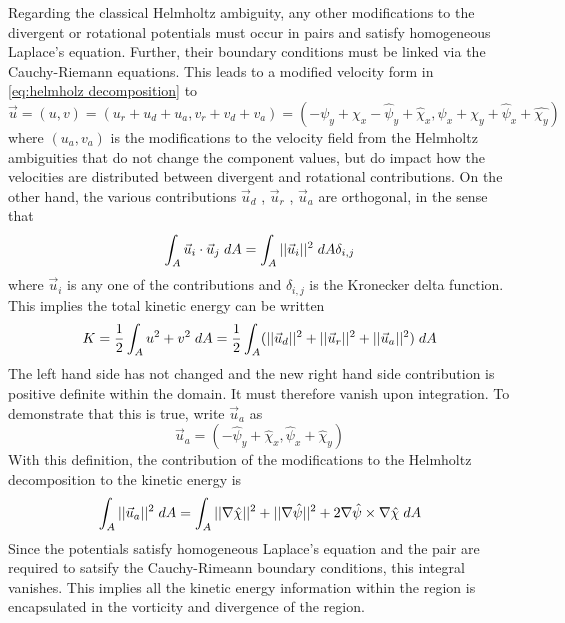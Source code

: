 \documentclass[draft]{agujournal2019}
\begin{document}
Regarding the classical Helmholtz ambiguity, any other modifications to the divergent or rotational potentials must occur in pairs and satisfy homogeneous Laplace’s equation. Further, their boundary conditions must be linked via the Cauchy-Riemann equations. This leads to a modified velocity form in \eqref{eq:helmholz decomposition} to
\begin{equation}
    \vec{u} = (u,v) = (u_r + u_d + u_a, v_r + v_d + v_a) = (-\psi_y + \chi_x - \hat{\psi}_y + \hat{\chi}_x, \psi_x + \chi_y + \hat{\psi}_x + \hat{\chi_y}) \label{eq:helmholz decomposition hatted}
\end{equation}
where $(u_a,v_a)$ is the modifications to the velocity field from the Helmholtz ambiguities that do not change the component values, but do impact how the velocities are distributed between divergent and rotational contributions. On the other hand, the various contributions $\vec{u}_d$ , $\vec{u}_r$ , $\vec{u}_a$ are orthogonal, in the sense that
\begin{equation}
    \int_A \vec{u}_i \cdot \vec{u}_j \hspace{1mm} dA = \int_A ||\vec{u}_i||^2 \hspace{1mm} dA \delta_{i,j}
\end{equation}
where $\vec{u}_i$ is any one of the contributions and $\delta_{i,j}$ is the Kronecker delta function. This implies the total kinetic energy can be written
\begin{equation}
    K = \frac{1}{2}\int_A u^2 + v^2 \hspace{1mm}dA = \frac{1}{2}\int_A (||\vec{u}_d||^2 + ||\vec{u}_r||^2 + ||\vec{u}_a||^2)  \hspace{1mm}dA
\end{equation}
The left hand side has not changed and the new right hand side contribution is positive definite within the domain. It must therefore vanish upon integration. To demonstrate that this is true, write $\vec{u}_a$ as
\begin{equation}
    \vec{u}_a = (-\hat{\psi}_y + \hat{\chi}_x, \hat{\psi}_x + \hat{\chi}_y)
\end{equation}
With this definition, the contribution of the modifications to the Helmholtz decomposition to the kinetic energy is
\begin{equation}
    \int_A ||\vec{u}_a||^2 \hspace{1mm} dA = \int_A ||\nabla \hat{\chi}||^2 + ||\nabla \hat{\psi}||^2 + 2\nabla\hat{\psi} \times \nabla \hat{\chi} \hspace{1mm} dA
\end{equation}
Since the potentials satisfy homogeneous Laplace's equation and the pair are required to satsify the Cauchy-Rimeann boundary conditions, this integral vanishes. This implies all the kinetic energy information within the region is encapsulated in the vorticity and divergence of the region.
\end{document}
